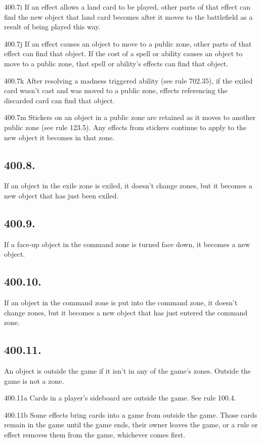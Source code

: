 400.7i If an effect allows a land card to be played, other parts of that effect can find the new object that land card becomes after it moves to the battlefield as a result of being played this way.

400.7j If an effect causes an object to move to a public zone, other parts of that effect can find that object. If the cost of a spell or ability causes an object to move to a public zone, that spell or ability’s effects can find that object.

400.7k After resolving a madness triggered ability (see rule 702.35), if the exiled card wasn’t cast and was moved to a public zone, effects referencing the discarded card can find that object.

400.7m Stickers on an object in a public zone are retained as it moves to another public zone (see rule 123.5). Any effects from stickers continue to apply to the new object it becomes in that zone.

\subsection*{400.8.}
If an object in the exile zone is exiled, it doesn’t change zones, but it becomes a new object that has just been exiled.

\subsection*{400.9.}
If a face-up object in the command zone is turned face down, it becomes a new object.

\subsection*{400.10.}
If an object in the command zone is put into the command zone, it doesn’t change zones, but it becomes a new object that has just entered the command zone.

\subsection*{400.11.}
An object is outside the game if it isn’t in any of the game’s zones. Outside the game is not a zone.

400.11a Cards in a player’s sideboard are outside the game. See rule 100.4.

400.11b Some effects bring cards into a game from outside the game. Those cards remain in the game until the game ends, their owner leaves the game, or a rule or effect removes them from the game, whichever comes first.

